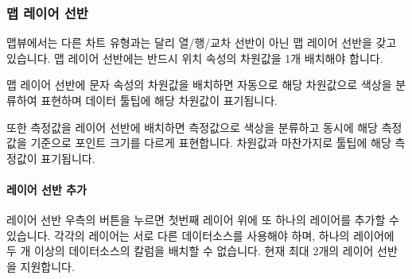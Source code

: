 \documentclass[letterpaper,10pt,english]{sphinxmanual}
\begin{document}
\subsubsection{맵 레이어 선반}
\label{\detokenize{discovery/part04/map_chart:id3}}\begin{quote}

\begin{figure}[H]
\centering

\noindent{}
\end{figure}
\end{quote}

맵뷰에서는 다른 차트 유형과는 달리 열/행/교차 선반이 아닌 맵 레이어 선반을 갖고 있습니다. 맵 레이어 선반에는 반드시 위치 속성의 차원값을 1개 배치해야 합니다.
\begin{quote}

\begin{figure}[H]
\centering

\noindent{}
\end{figure}
\end{quote}

맵 레이어 선반에 문자 속성의 차원값을 배치하면 자동으로 해당 차원값으로 색상을 분류하여 표현하며 데이터 툴팁에 해당 차원값이 표기됩니다.
\begin{quote}

\begin{figure}[H]
\centering

\noindent{}
\end{figure}
\end{quote}

또한 측정값을 레이어 선반에 배치하면 측정값으로 색상을 분류하고 동시에 해당 측정값을 기준으로 포인트 크기를 다르게 표현합니다. 차원값과 마찬가지로 툴팁에 해당 측정값이 표기됩니다.
\begin{quote}

\begin{figure}[H]
\centering

\noindent{}
\end{figure}
\end{quote}


\paragraph{레이어 선반 추가}
\label{\detokenize{discovery/part04/map_chart:id4}}
레이어 선반 우측의 \sphinxcode{\sphinxupquote{+}} 버튼을 누르면 첫번째 레이어 위에 또 하나의 레이어를 추가할 수 있습니다. 각각의 레이어는 서로 다른 데이터소스를 사용해야 하며, 하나의 레이어에 두 개 이상의 데이터소스의 칼럼을 배치할 수 없습니다. 현재 최대 2개의 레이어 선반을 지원합니다.
\begin{quote}

\begin{figure}[H]
\centering

\noindent{}
\end{figure}
\end{quote}
\end{document}
